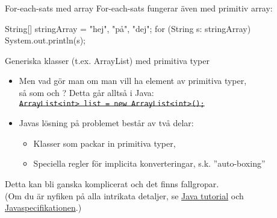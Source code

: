 \begin{Slide}{For-each-sats med array}
For-each-sats fungerar även med primitiv array:
\begin{Code}[numberstyle=,language=Java]
        String[] stringArray = {"hej", "på", "dej"};
        for (String s: stringArray) {
            System.out.println(s);
        }
\end{Code}
\end{Slide}


\begin{Slide}{Generiska klasser (t.ex. ArrayList) med primitiva typer}
\begin{itemize}\footnotesize
\item Men vad gör man om man vill ha element av primitiva typer, \\ så som  och ? 
Detta går alltså  i Java: \\
\sout{\texttt{ArrayList<int> list = new ArrayList<int>();}}

\vspace{2em}
\item Javas lösning på problemet består av två delar:
\begin{itemize}\footnotesize
\item Klasser som packar in primitiva typer, 
\item Speciella regler för implicita konverteringar, s.k. ''auto-boxing'' 
\end{itemize}
\end{itemize}
\scriptsize\vspace{1em}
Detta kan bli ganska komplicerat och det finns fallgropar.\\
(Om du är nyfiken på alla intrikata detaljer, se
\href{https://docs.oracle.com/javase/tutorial/java/data/autoboxing.html}{Java tutorial} och   \href{https://docs.oracle.com/javase/specs/jls/se8/html/jls-5.html#jls-5.1.7}{Javaspecifikationen}.)
\end{Slide}

